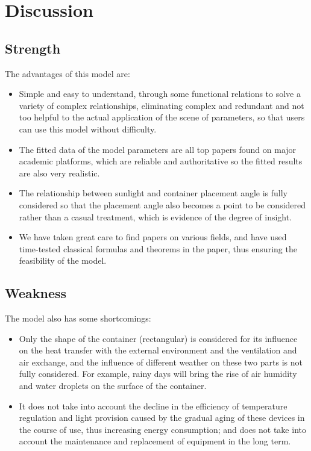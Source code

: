 \section{Discussion}
\subsection{Strength}
The advantages of this model are:
\begin{itemize}
    \item Simple and easy to understand, through some functional relations to solve a variety of complex relationships, eliminating complex and redundant and not too helpful to the actual application of the scene of parameters, so that users can use this model without difficulty.
    \item The fitted data of the model parameters are all top papers found on major academic platforms, which are reliable and authoritative so the fitted results are also very realistic.
    \item The relationship between sunlight and container placement angle is fully considered so that the placement angle also becomes a point to be considered rather than a casual treatment, which is evidence of the degree of insight.
    \item We have taken great care to find papers on various fields, and have used time-tested classical formulas and theorems in the paper, thus ensuring the feasibility of the model.
\end{itemize}
\subsection{Weakness}
The model also has some shortcomings:
\begin{itemize}
    \item Only the shape of the container (rectangular) is considered for its influence on the heat transfer with the external environment and the ventilation and air exchange, and the influence of different weather on these two parts is not fully considered. For example, rainy days will bring the rise of air humidity and water droplets on the surface of the container.
    \item It does not take into account the decline in the efficiency of temperature regulation and light provision caused by the gradual aging of these devices in the course of use, thus increasing energy consumption; and does not take into account the maintenance and replacement of equipment in the long term.
\end{itemize}
